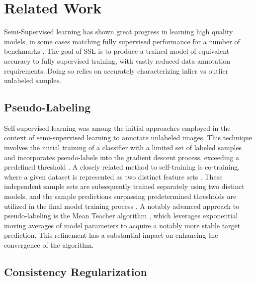 \documentclass[10pt,twocolumn,letterpaper]{article}
\begin{document}
\section{Related Work}


Semi-Supervised learning has shown great progress in learning high quality models, in some cases matching fully supervised performance for a number of benchmarks \cite{zhang2021flexmatch}.
The goal of SSL is to produce a trained model of equivalent accuracy to fully supervised training, with vastly reduced data annotation requirements.
Doing so relies on accurately characterizing inlier vs outlier unlabeled samples.

\subsection{Pseudo-Labeling}
Self-supervised learning was among the initial approaches employed in the context of semi-supervised learning to annotate unlabeled images. 
This technique involves the initial training of a classifier with a limited set of labeled samples and incorporates pseudo-labels into the gradient descent process, exceeding a predefined threshold \cite{yarowsky1995unsupervised, mcclosky2006reranking, olivier2006semi,zhai2019s4l,livieris2019predicting,rosenberg2005semi,menon2020deep}. 
A closely related method to self-training is co-training, where a given dataset is represented as two distinct feature sets \cite{blum1998combining}. 
These independent sample sets are subsequently trained separately using two distinct models, and the sample predictions surpassing predetermined thresholds are utilized in the final model training process \cite{blum1998combining,prakash2014survey}.
A notably advanced approach to pseudo-labeling is the Mean Teacher algorithm \cite{tarvainen2017mean}, which leverages exponential moving averages of model parameters to acquire a notably more stable target prediction. 
This refinement has a substantial impact on enhancing the convergence of the algorithm.


\subsection{Consistency Regularization}
\end{document}

